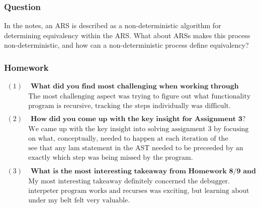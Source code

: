 \documentclass{article}
\theoremstyle{theorem}
\theoremstyle{definition}
\theoremstyle{remark}
\begin{document}
\subsubsection*{Question} In the notes, an ARS is described as a non-deterministic algorithm for determining equivalency within the ARS. What about ARSs makes this process non-deterministic, and how can a non-deterministic process define equivalency?

\subsubsection*{Homework}

\[
\begin{aligned}
  (1)& \textbf{ What did you find most challenging when working through Homework 8/9 and Assignment 3?}\\
     &  \text{The most challenging aspect was trying to figure out what functionality the program lacked. Because the}\\ 
     &  \text{program is recursive, tracking the steps individually was difficult.}\\
     &\\
  (2)& \textbf{ How did you come up with the key insight for Assignment 3?}\\
     &  \text{We came up with the key insight into solving assignment 3 by focusing less on the the program and more}\\
     &  \text{on what, conceptually, needed to happen at each iteration of the evaluation process. This way, we could}\\
     &  \text{see that any lam statement in the AST needed to be preceeded by an app statement, and figure out }\\
     &  \text{exactly which step was being missed by the program.}\\
     &\\
  (3)& \textbf{ What is the most interesting takeaway from Homework 8/9 and Assignment 3?}\\
     &  \text{My most interesting takeaway definitely concerned the debugger. Conceptually learning more abot how an}\\
     &  \text{interpeter program works and recurses was exciting, but learning about another tool and getting it}\\
     &  \text{under my belt felt very valuable.}\\
\end{aligned}
\]
\end{document}
